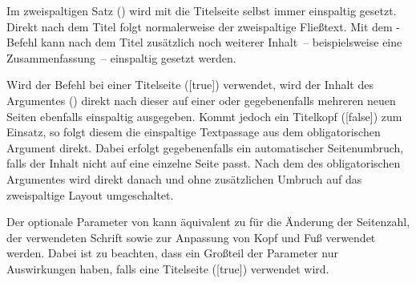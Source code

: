 \begin{Declaration}{%
}
\printdeclarationlist%
%
%
%
%
Im zweispaltigen Satz () wird mit  die 
Titelseite selbst immer einspaltig gesetzt. Direkt nach dem Titel folgt 
normalerweise der zweispaltige Fließtext. Mit dem \TUDScript-Befehl 
 kann nach dem Titel zusätzlich noch weiterer 
Inhalt~-- beispielsweise eine Zusammenfassung~-- einspaltig gesetzt werden.

Wird der Befehl bei einer Titelseite ([true]) verwendet, wird 
der Inhalt des Argumentes () direkt nach dieser auf einer 
oder gegebenenfalls mehreren neuen Seiten ebenfalls einspaltig ausgegeben. 
Kommt jedoch ein Titelkopf ([false]) zum Einsatz, so folgt 
diesem die einspaltige Textpassage aus dem obligatorischen Argument direkt. 
Dabei erfolgt gegebenenfalls ein automatischer Seitenumbruch, falls der Inhalt 
nicht auf eine einzelne Seite passt. Nach dem  des 
obligatorischen Argumentes wird direkt danach und ohne zusätzlichen Umbruch auf 
das zweispaltige Layout umgeschaltet.

Der optionale Parameter von  kann äquivalent zu 
 für die Änderung der Seitenzahl, der verwendeten Schrift 
sowie zur Anpassung von Kopf und Fuß verwendet werden. Dabei ist zu beachten, 
dass ein Großteil der Parameter nur Auswirkungen haben, falls eine Titelseite
([true]) verwendet wird.
\end{Declaration}

